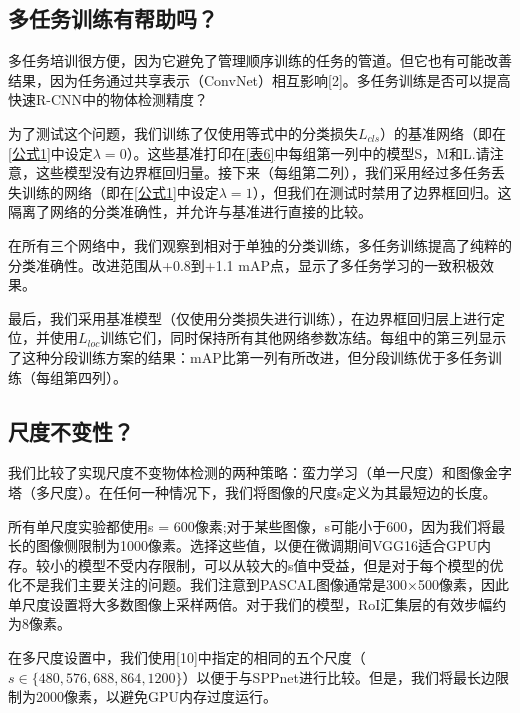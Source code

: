 \subsection{多任务训练有帮助吗？}
\par 多任务培训很方便，因为它避免了管理顺序训练的任务的管道。但它也有可能改善结果，因为任务通过共享表示（ConvNet）相互影响[2]。多任务训练是否可以提高快速R-CNN中的物体检测精度？
\par 为了测试这个问题，我们训练了仅使用等式中的分类损失$L_{cls}$）的基准网络（即在\ref{公式1}中设定$\lambda =0$）。这些基准打印在\ref{表6}中每组第一列中的模型S，M和L.请注意，这些模型没有边界框回归量。接下来（每组第二列），我们采用经过多任务丢失训练的网络（即在\ref{公式1}中设定$\lambda =1$），但我们在测试时禁用了边界框回归。这隔离了网络的分类准确性，并允许与基准进行直接的比较。
\par 在所有三个网络中，我们观察到相对于单独的分类训练，多任务训练提高了纯粹的分类准确性。改进范围从+0.8到+1.1 mAP点，显示了多任务学习的一致积极效果。
\par 最后，我们采用基准模型（仅使用分类损失进行训练），在边界框回归层上进行定位，并使用$L_{loc}$训练它们，同时保持所有其他网络参数冻结。每组中的第三列显示了这种分段训练方案的结果：mAP比第一列有所改进，但分段训练优于多任务训练（每组第四列）。

\subsection{尺度不变性？}
\par 我们比较了实现尺度不变物体检测的两种策略：蛮力学习（单一尺度）和图像金字塔（多尺度）。在任何一种情况下，我们将图像的尺度s定义为其最短边的长度。
\par 所有单尺度实验都使用s = 600像素;对于某些图像，s可能小于600，因为我们将最长的图像侧限制为1000像素。选择这些值，以便在微调期间VGG16适合GPU内存。较小的模型不受内存限制，可以从较大的s值中受益，但是对于每个模型的优化不是我们主要关注的问题。我们注意到PASCAL图像通常是300×500像素，因此单尺度设置将大多数图像上采样两倍。对于我们的模型，RoI汇集层的有效步幅约为8像素。
\par 在多尺度设置中，我们使用[10]中指定的相同的五个尺度（$s\in \{480,576,688,864,1200\}$）以便于与SPPnet进行比较。但是，我们将最长边限制为2000像素，以避免GPU内存过度运行。


